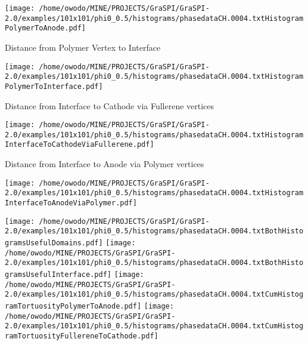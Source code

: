 \documentclass{article}
\begin{document}
\begin{center}
{\texttt{[image: /home/owodo/MINE/PROJECTS/GraSPI/GraSPI-2.0/examples/101x101/phi0\_0.5/histograms/phasedataCH.0004.txtHistogramPolymerToAnode.pdf]}}
\parbox{0.33\textwidth}{\begin{scriptsize}Distance from Polymer Vertex to Interface\end{scriptsize}\newline
\texttt{[image: /home/owodo/MINE/PROJECTS/GraSPI/GraSPI-2.0/examples/101x101/phi0\_0.5/histograms/phasedataCH.0004.txtHistogramPolymerToInterface.pdf]}} \newline
\parbox{0.49\textwidth}{\begin{scriptsize}Distance from Interface to Cathode via Fullerene vertices \end{scriptsize}\newline
\texttt{[image: /home/owodo/MINE/PROJECTS/GraSPI/GraSPI-2.0/examples/101x101/phi0\_0.5/histograms/phasedataCH.0004.txtHistogramInterfaceToCathodeViaFullerene.pdf]}}
\parbox{0.49\textwidth}{\begin{scriptsize}Distance from Interface to Anode via Polymer vertices \end{scriptsize}\newline
\texttt{[image: /home/owodo/MINE/PROJECTS/GraSPI/GraSPI-2.0/examples/101x101/phi0\_0.5/histograms/phasedataCH.0004.txtHistogramInterfaceToAnodeViaPolymer.pdf]}}\newline
\texttt{[image: /home/owodo/MINE/PROJECTS/GraSPI/GraSPI-2.0/examples/101x101/phi0\_0.5/histograms/phasedataCH.0004.txtBothHistogramsUsefulDomains.pdf]}
\texttt{[image: /home/owodo/MINE/PROJECTS/GraSPI/GraSPI-2.0/examples/101x101/phi0\_0.5/histograms/phasedataCH.0004.txtBothHistogramsUsefulInterface.pdf]}
\texttt{[image: /home/owodo/MINE/PROJECTS/GraSPI/GraSPI-2.0/examples/101x101/phi0\_0.5/histograms/phasedataCH.0004.txtCumHistogramTortuosityPolymerToAnode.pdf]}
\texttt{[image: /home/owodo/MINE/PROJECTS/GraSPI/GraSPI-2.0/examples/101x101/phi0\_0.5/histograms/phasedataCH.0004.txtCumHistogramTortuosityFullereneToCathode.pdf]}
\end{center}
\end{document}
